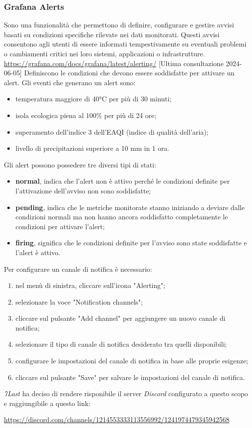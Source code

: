 \subsubsection{Grafana Alerts}
Sono una funzionalità che permettono di definire, configurare e gestire avvisi basati su condizioni specifiche rilevate nei dati monitorati. Questi avvisi consentono agli utenti di essere informati tempestivamente su eventuali problemi o cambiamenti critici nei loro sistemi, applicazioni o infrastrutture.
\url{https://grafana.com/docs/grafana/latest/alerting/} [Ultima consultazione 2024-06-05]
Definiscono le condizioni che devono essere soddisfatte per attivare un alert. Gli eventi che generano un alert sono:
\begin{itemize}
	\item temperatura maggiore di 40°C per più di 30 minuti;
	\item isola ecologica piena al 100\% per più di 24 ore;
	\item superamento dell'indice 3 dell'EAQI (indice di qualità dell'aria);
	\item livello di precipitazioni superiore a 10 mm in 1 ora.
\end{itemize}
Gli alert possono possedere tre diversi tipi di stati:
\begin{itemize}
	\item \textbf{normal}, indica che l'alert non è attivo perché le condizioni definite per l'attivazione dell'avviso non sono soddisfatte;
	\item \textbf{pending}, indica che le metriche monitorate stanno iniziando a deviare dalle condizioni normali ma non hanno ancora soddisfatto completamente le condizioni per attivare l'alert;
	\item \textbf{firing}, significa che le condizioni definite per l'avviso sono state soddisfatte e l'alert è attivo.
\end{itemize}
Per configurare un canale di notifica è necessario:
\begin{enumerate}
	\item nel menù di sinistra, cliccare sull'icona "Alerting";
	\item selezionare la voce "Notification channels";
	\item cliccare sul pulsante "Add channel" per aggiungere un nuovo canale di notifica;
	\item selezionare il tipo di canale di notifica desiderato tra quelli disponibili;
	\item configurare le impostazioni del canale di notifica in base alle proprie esigenze;
	\item cliccare sul pulsante "Save" per salvare le impostazioni del canale di notifica.
\end{enumerate}
\textit{7Last} ha deciso di rendere risponibile il server \textit{Discord} configurato a questo scopo e raggiungibile a questo link:
\begin{center}
	\url{https://discord.com/channels/1214553333113556992/1241974479345942568}
\end{center}
